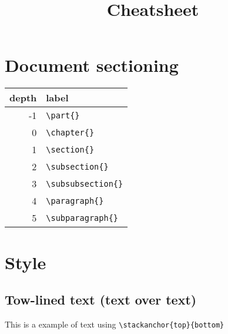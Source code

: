 \documentclass{customSynthesis}
\begin{document}
\title{Cheatsheet}

\section*{Document sectioning}

\begin{tabular}{r|l}
\hline 
depth & label \\ 
\hline 
-1 &  \verb|\part{}| \\ 
\hline 
0 & \verb|\chapter{}| \\ 
\hline 
1 & \verb|\section{}| \\ 
\hline 
2 & \verb|\subsection{}| \\ 
\hline 
3 & \verb|\subsubsection{}| \\ 
\hline 
4 & \verb|\paragraph{}| \\ 
\hline 
5 & \verb|\subparagraph{}| \\ 
\hline 
\end{tabular}

\section*{Style}

\subsection*{Tow-lined text (text over text)}

This is a example of  text using \verb|\stackanchor{top}{bottom}|
\end{document}
